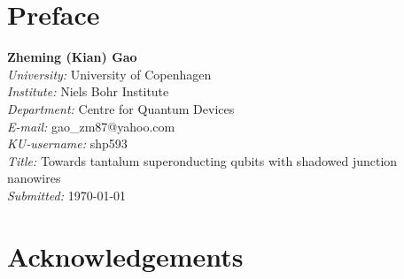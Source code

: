
\section{Preface}



%


\noindent\textbf{Zheming (Kian) Gao} \\

\noindent\emph{University:} University of Copenhagen\\
\emph{Institute:} Niels Bohr Institute\\
\emph{Department:} Centre for Quantum Devices\\
\emph{E-mail:} gao\_zm87@yahoo.com\\
\emph{KU-username:} shp593\\
\emph{Title:} Towards tantalum superonducting qubits with shadowed junction nanowires\\
\emph{Submitted:} \today
\clearpage
\section{Acknowledgements}

